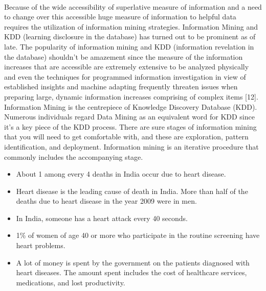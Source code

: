 \documentclass[oneside,12pt]{Classes/VTU}
\begin{document}
    \paragraph{}
    Because of the wide accessibility of superlative measure of information and a need to change over this accessible huge measure of information to helpful data requires the utilization of information mining strategies. Information Mining and KDD (learning disclosure in the database) has turned out to be prominent as of late. The popularity of information mining and KDD (information revelation in the database) shouldn't be amazement since the measure of the information increases that are accessible are extremely extensive to be analyzed physically and even the techniques for programmed information investigation in view of established insights and machine adapting frequently threaten issues when preparing large, dynamic information increases comprising of complex items [12]. Information Mining is the centrepiece of Knowledge Discovery Database (KDD). Numerous individuals regard Data Mining as an equivalent word for KDD since it's a key piece of the KDD process. There are sure stages of information mining that you will need to get comfortable with, and these are exploration, pattern identification, and deployment. Information mining is an iterative procedure that commonly includes the accompanying stage.
    \pagebreak
    \begin{itemize}
    	\item About 1 among every 4 deaths in India occur due to heart disease.
    	\item Heart disease is the leading cause of death in India. More than half of the deaths due to heart disease in the year 2009 were in men.
    	\item In India, someone has a heart attack every 40 seconds.
    	\item 1\% of women of age 40 or more who participate in the routine screening have heart problems.
    	\item A lot of money is spent by the government on the patients diagnosed with heart diseases. The amount spent includes the cost of healthcare services, medications, and lost productivity.
    \end{itemize}
    
\end{document}
